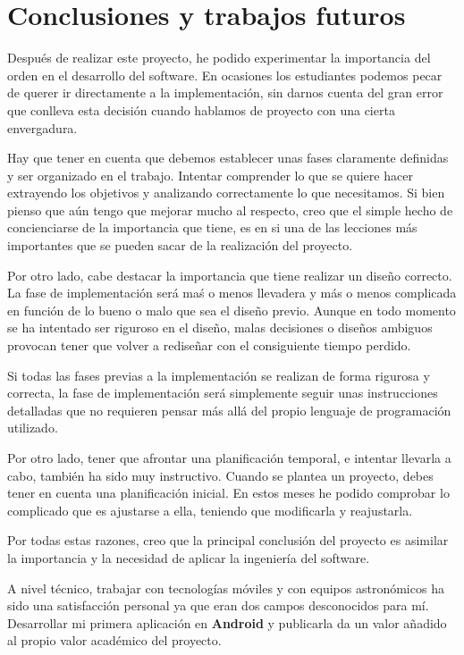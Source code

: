 \chapter{Conclusiones y trabajos futuros}

Después de realizar este proyecto, he podido experimentar la importancia del orden en el desarrollo del software. En ocasiones los estudiantes podemos pecar de querer ir directamente a la implementación, sin darnos cuenta del gran error que conlleva esta decisión cuando hablamos de proyecto con una cierta envergadura.

\bigskip
Hay que tener en cuenta que debemos establecer unas fases claramente definidas y ser organizado en el trabajo. Intentar comprender lo que se quiere hacer extrayendo los objetivos y analizando correctamente lo que necesitamos. Si bien pienso que aún tengo que mejorar mucho al respecto, creo que el simple hecho de concienciarse de la importancia que tiene, es en si una de las lecciones más importantes que se pueden sacar de la realización del proyecto.

\bigskip
Por otro lado, cabe destacar la importancia que tiene realizar un diseño correcto. La fase de implementación será maś o menos llevadera y más o menos complicada en función de lo bueno o malo que sea el diseño previo. Aunque en todo momento se ha intentado ser riguroso en el diseño, malas decisiones o diseños ambiguos provocan tener que volver a rediseñar con el consiguiente tiempo perdido.

\bigskip
Si todas las fases previas a la implementación se realizan de forma rigurosa y correcta, la fase de implementación será simplemente seguir unas instrucciones detalladas que no requieren pensar más allá del propio lenguaje de programación utilizado.

\bigskip
Por otro lado, tener que afrontar una planificación temporal, e intentar llevarla a cabo, también ha sido muy instructivo. Cuando se plantea un proyecto, debes tener en cuenta una planificación inicial. En estos meses he podido comprobar lo complicado que es ajustarse a ella, teniendo que modificarla y reajustarla.


\bigskip
Por todas estas razones, creo que la principal conclusión del proyecto es asimilar la importancia y la necesidad de aplicar la ingeniería del software.

\bigskip
A nivel técnico, trabajar con tecnologías móviles y con equipos astronómicos ha sido una satisfacción personal ya que eran dos campos desconocidos para mí. Desarrollar mi primera aplicación en \textbf{Android} y publicarla da un valor añadido al propio valor académico del proyecto.

